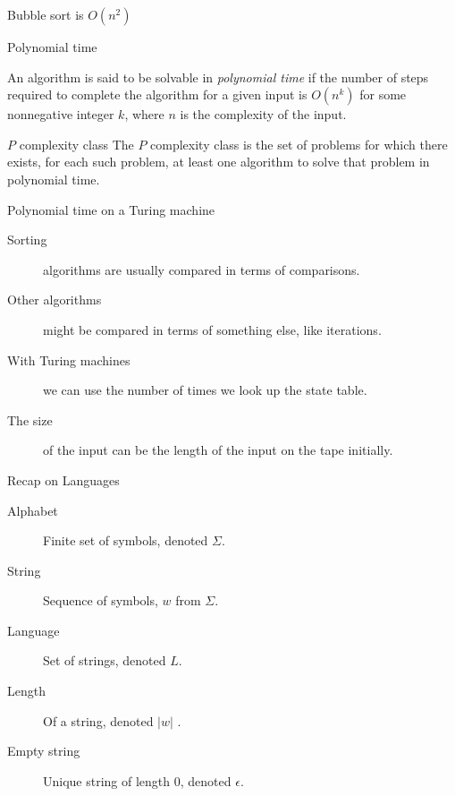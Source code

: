 \begin{frame}[fragile]{Bubble sort is $O(n^2)$}
\begin{center}
\end{center}
\end{frame}


\begin{frame}{Polynomial time}
  \begin{definition}
    An algorithm is said to be solvable in \emph{polynomial time} if the number of steps required to complete the algorithm for a given input is $O(n^k)$ for some nonnegative integer $k$, where $n$ is the complexity of the input.
  \end{definition}
  \vspace{0.5cm}
  \begin{block}{$P$ complexity class}
    The $P$ complexity class is the set of problems for which there exists, for each such problem, at least one algorithm to solve that problem in polynomial time.
  \end{block}

\end{frame}


\begin{frame}{Polynomial time on a Turing machine}
  \begin{description}
    \item[Sorting] algorithms are usually compared in terms of comparisons.
    \item[Other algorithms] might be compared in terms of something else, like iterations.
    \item[With Turing machines] we can use the number of times we look up the state table.
    \item[The size] of the input can be the length of the input on the tape initially.
  \end{description}
\end{frame}


\begin{frame}{Recap on Languages}
  \begin{description}
    \item[Alphabet] Finite set of symbols, denoted $\Sigma$.
    \item[String] Sequence of symbols, $w$ from $\Sigma$.
    \item[Language] Set of strings, denoted $L$.
    \item[Length] Of a string, denoted $|w|$  .
    \item[Empty string] Unique string of length 0, denoted $\epsilon$.
  \end{description}
\end{frame}


